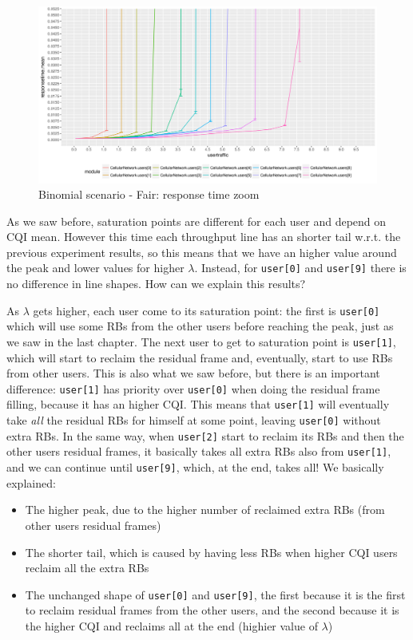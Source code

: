 \begin{figure}[H]
  \includegraphics[width=1\textwidth]{images/allrt-binombest.png}
  \caption{Binomial scenario - Fair: response time zoom}
  \label{fig:allrt-binombest}
\end{figure}

As we saw before, saturation points are different for each user and depend on CQI mean. However this time each throughput line has an shorter tail w.r.t. the previous experiment results, so this means that we have an higher value around the peak and lower values for higher \(\lambda\). Instead, for \texttt{user[0]} and \texttt{user[9]} there is no difference in line shapes. How can we explain this results?

As \(\lambda\) gets higher, each user come to its saturation point: the first is \texttt{user[0]} which will use some RBs from the other users before reaching the peak, just as we saw in the last chapter. The next user to get to saturation point is \texttt{user[1]}, which will start to reclaim the residual frame and, eventually, start to use RBs from other users. This is also what we saw before, but there is an important difference: \texttt{user[1]} has priority over \texttt{user[0]} when doing the residual frame filling, because it has an higher CQI. This means that \texttt{user[1]} will eventually take \textit{all} the residual RBs for himself at some point, leaving \texttt{user[0]} without extra RBs. In the same way, when \texttt{user[2]} start to reclaim its RBs and then the other users residual frames, it basically takes all extra RBs also from \texttt{user[1]}, and we can continue until \texttt{user[9]}, which, at the end, takes all!
We basically explained:
\begin{itemize}
	\item The higher peak, due to the higher number of reclaimed extra RBs (from other users residual frames)
	\item The shorter tail, which is caused by having less RBs when higher CQI users reclaim all the extra RBs
	\item The unchanged shape of \texttt{user[0]} and \texttt{user[9]}, the first because it is the first to reclaim residual frames from the other users, and the second because it is the higher CQI and reclaims all at the end (highier value of \(\lambda\))
\end{itemize}

